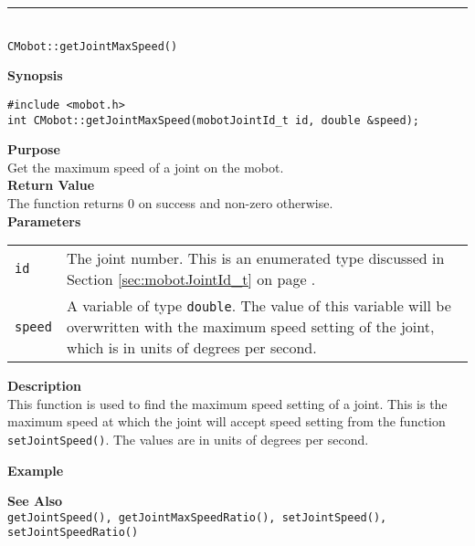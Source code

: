 \noindent
\vspace{5pt}
\rule{4.5in}{0.015in}\\
\noindent
{\LARGE \texttt{CMobot::getJointMaxSpeed()}}\\
{}

\noindent
{\bf Synopsis}
\vspace{-8pt}
\begin{verbatim}
#include <mobot.h>
int CMobot::getJointMaxSpeed(mobotJointId_t id, double &speed);
\end{verbatim}

\noindent
{\bf Purpose}\\
Get the maximum speed of a joint on the mobot.\\

\noindent
{\bf Return Value}\\
The function returns 0 on success and non-zero otherwise.\\

\noindent
{\bf Parameters}
\vspace{-0.1in}
\begin{description}
\item               
\begin{tabular}{p{10 mm}p{145 mm}}
\texttt{id} & The joint number. This is an enumerated type 
discussed in Section \ref{sec:mobotJointId_t} on page
\pageref{sec:mobotJointId_t}.\\
\texttt{speed} & A variable of type \texttt{double}. The value of this variable
will be overwritten with the maximum speed setting of the joint, which is 
in units of degrees per second.
\end{tabular}
\end{description}

\noindent
{\bf Description}\\
This function is used to find the maximum speed setting of a joint.  This is
the maximum speed at which the joint will accept speed setting from the 
function \texttt{setJointSpeed()}. The values
are in units of degrees per second.

\noindent
{\bf Example}\\
\noindent

\noindent
{\bf See Also}\\
\texttt{getJointSpeed(), getJointMaxSpeedRatio(), setJointSpeed(), setJointSpeedRatio()}

